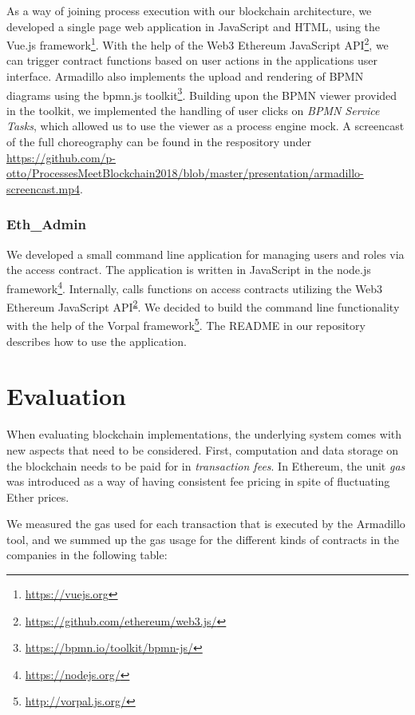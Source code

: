 \documentclass[runningheads]{llncs}
\begin{document}
As a way of joining process execution with our blockchain architecture, we developed a single page web application in JavaScript and HTML, using the Vue.js framework\footnote{\url{https://vuejs.org}}.
With the help of the Web3 Ethereum JavaScript API\footnote{\label{web3}\url{https://github.com/ethereum/web3.js/}}, we can trigger contract functions based on user actions in the applications user interface.
Armadillo also implements the upload and rendering of BPMN diagrams using the bpmn.js toolkit\footnote{\url{https://bpmn.io/toolkit/bpmn-js/}}.
Building upon the BPMN viewer provided in the toolkit, we implemented the handling of user clicks on \textit{BPMN Service Tasks}, which allowed us to use the viewer as a process engine mock.
A screencast of the full choreography can be found in the respository under \url{https://github.com/p-otto/ProcessesMeetBlockchain2018/blob/master/presentation/armadillo-screencast.mp4}.

\subsubsection{Eth\_Admin}

We developed a small command line application for managing users and roles via the access contract.
The application is written in JavaScript in the node.js framework\footnote{\url{https://nodejs.org/}}.
Internally, calls functions on access contracts utilizing the Web3 Ethereum JavaScript API\textsuperscript{\ref{web3}}.
We decided to build the command line functionality with the help of the Vorpal framework\footnote{\url{http://vorpal.js.org/}}.
The README in our repository describes how to use the application.

\section{Evaluation}

When evaluating blockchain implementations, the underlying system comes with new aspects that need to be considered.
First, computation and data storage on the blockchain needs to be paid for in \textit{transaction fees}.
In Ethereum, the unit \textit{gas} was introduced as a way of having consistent fee pricing in spite of fluctuating Ether prices.

We measured the gas used for each transaction that is executed by the Armadillo tool, and we summed up the gas usage for the different kinds of contracts in the companies in the following table:
\end{document}
